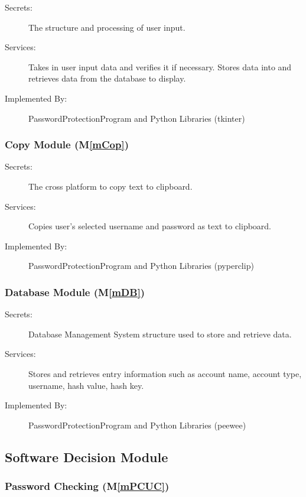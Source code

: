 \documentclass[12pt, titlepage]{article}
\newcommand{\mref}[1]{M\ref{#1}}
\begin{document}
\begin{description}
\item[Secrets:] The structure and processing of user input.
\item[Services:] Takes in user input data and verifies it if necessary. Stores data into and retrieves data from the database to display.
\item[Implemented By:] PasswordProtectionProgram and Python Libraries (tkinter)
\end{description}

\subsubsection{Copy Module (\mref{mCop})}

\begin{description}
\item[Secrets:] The cross platform to copy text to clipboard.
\item[Services:] Copies user's selected username and password as text to clipboard.
\item[Implemented By:] PasswordProtectionProgram and Python Libraries (pyperclip)
\end{description}

\subsubsection{Database Module (\mref{mDB})}

\begin{description}
\item[Secrets:] Database Management System structure used to store and retrieve data.
\item[Services:] Stores and retrieves entry information such as account name, account type, username, hash value, hash key.
\item[Implemented By:] PasswordProtectionProgram and Python Libraries (peewee)
\end{description}


\subsection{Software Decision Module}

\subsubsection{Password Checking (\mref{mPCUC})}
\end{document}
